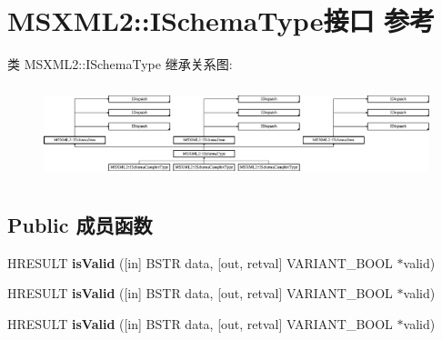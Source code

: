 \hypertarget{interface_m_s_x_m_l2_1_1_i_schema_type}{}\section{M\+S\+X\+M\+L2\+:\+:I\+Schema\+Type接口 参考}
\label{interface_m_s_x_m_l2_1_1_i_schema_type}
类 M\+S\+X\+M\+L2\+:\+:I\+Schema\+Type 继承关系图\+:\begin{figure}[H]
\begin{center}
\leavevmode
\includegraphics[height=2.758621cm]{interface_m_s_x_m_l2_1_1_i_schema_type}
\end{center}
\end{figure}
\subsection*{Public 成员函数}
\begin{DoxyCompactItemize}
\item 
\mbox{\label{interface_m_s_x_m_l2_1_1_i_schema_type_a5bcf0f987e5dd2d03a6dceba481ebc50}} 
H\+R\+E\+S\+U\+LT {\bfseries is\+Valid} (\mbox{[}in\mbox{]} B\+S\+TR data, \mbox{[}out, retval\mbox{]} V\+A\+R\+I\+A\+N\+T\+\_\+\+B\+O\+OL $\ast$valid)
\item 
\mbox{\label{interface_m_s_x_m_l2_1_1_i_schema_type_a5bcf0f987e5dd2d03a6dceba481ebc50}} 
H\+R\+E\+S\+U\+LT {\bfseries is\+Valid} (\mbox{[}in\mbox{]} B\+S\+TR data, \mbox{[}out, retval\mbox{]} V\+A\+R\+I\+A\+N\+T\+\_\+\+B\+O\+OL $\ast$valid)
\item 
\mbox{\label{interface_m_s_x_m_l2_1_1_i_schema_type_a5bcf0f987e5dd2d03a6dceba481ebc50}} 
H\+R\+E\+S\+U\+LT {\bfseries is\+Valid} (\mbox{[}in\mbox{]} B\+S\+TR data, \mbox{[}out, retval\mbox{]} V\+A\+R\+I\+A\+N\+T\+\_\+\+B\+O\+OL $\ast$valid)
\end{DoxyCompactItemize}
